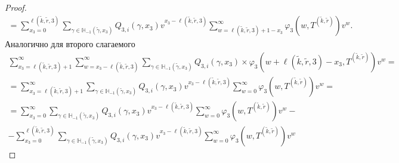 \documentclass{report}
\begin{document}
\begin{proof}
\begin{multline}
=\sum_{x_3=0}^{\ell(\tilde{k},\tilde{r},3)}  \sum_{\gamma \in {\mathbb H}_{-1}(\tilde{\gamma},x_3)} Q_{3,i}(\gamma,x_3) v^{x_3-\ell(\tilde{k},\tilde{r},3)}  \sum_{w=\ell(\tilde{k},\tilde{r},3) + 1 -x_3}^{\infty}
\varphi_3(w,T^{(\tilde{k},\tilde{r})}) v^w.
\label{sum:one}
\end{multline}
Аналогично для второго слагаемого
\begin{multline}
 \sum_{x_3=\ell(\tilde{k},\tilde{r},3) + 1}^{\infty}\sum_{w=x_3-\ell(\tilde{k},\tilde{r},3)}^{\infty} \sum_{\gamma \in {\mathbb H}_{-1}(\tilde{\gamma},x_3)} Q_{3,i}(\gamma,x_3) \times 
\varphi_3(w + \ell(\tilde{k},\tilde{r},3) - x_3,T^{(\tilde{k},\tilde{r})}) v^w = \\
=  \sum_{x_3=\ell(\tilde{k},\tilde{r},3) + 1}^{\infty} \sum_{\gamma \in {\mathbb H}_{-1}(\tilde{\gamma},x_3)} Q_{3,i}(\gamma,x_3) v^{x_3-\ell(\tilde{k},\tilde{r},3)}\sum_{w=0}^{\infty}  
\varphi_3(w,T^{(\tilde{k},\tilde{r})}) v^w = \\
= \sum_{x_3=0}^{\infty} \sum_{\gamma \in {\mathbb H}_{-1}(\tilde{\gamma},x_3)} Q_{3,i}(\gamma,x_3) v^{x_3-\ell(\tilde{k},\tilde{r},3)}\sum_{w=0}^{\infty} 
\varphi_3(w,T^{(\tilde{k},\tilde{r})}) v^w - \\
- \sum_{x_3=0}^{\ell(\tilde{k},\tilde{r},3)} \sum_{\gamma \in {\mathbb H}_{-1}(\tilde{\gamma},x_3)} Q_{3,i}(\gamma,x_3) v^{x_3-\ell(\tilde{k},\tilde{r},3)}\sum_{w=0}^{\infty}
\varphi_3(w,T^{(\tilde{k},\tilde{r})}) v^w
\label{sum:two}
\end{multline}


\end{proof}
\end{document}
